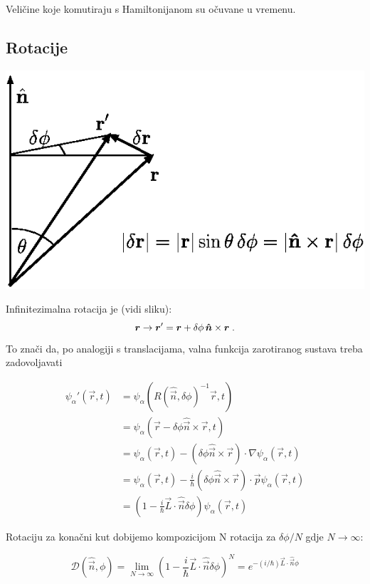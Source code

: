 Veličine koje komutiraju s Hamiltonijanom su očuvane u vremenu.

\subsection{Rotacije}

\centerline{\includegraphics[scale=0.8]{pics/infrotacija.eps}}
Infinitezimalna rotacija je (vidi sliku):
  \begin{displaymath}
  \vec{r}\to\vec{r}'=\vec{r}+\delta\phi\, \unitn\times\vec{r}  \;.
 \end{displaymath}
To znači da, po analogiji s translacijama, valna funkcija zarotiranog
sustava treba zadovoljavati

\begin{equation*}
\begin{split}
\psi_{\alpha}'(\vec{r}, t)&=\psi_{\alpha}(R(\hat{\vec{n}},\delta \phi)^{-1}
\vec{r}, t) \\
 &=\psi_{\alpha}(\vec{r}-\delta\phi\hat{\vec{n}}\times\vec{r}, t) \\
 &=\psi_{\alpha}(\vec{r}, t)-(\delta\phi\hat{\vec{n}}\times\vec{r})\cdot
  \nabla\psi_{\alpha}(\vec{r}, t) \\
 &= \psi_{\alpha}(\vec{r}, t)-\frac{i}{\hbar}(\delta\phi\hat{\vec{n}}\times
  \vec{r})\cdot \vec{p}\psi_{\alpha}(\vec{r}, t) \\
 &= \left(1-\frac{i}{\hbar}\vec{L}\cdot\hat{\vec{n}}\delta\phi \right)
  \psi_{\alpha}(\vec{r}, t)
\end{split}
\end{equation*}

Rotaciju za konačni kut dobijemo kompozicijom N rotacija za $\delta\phi / N$
gdje $N\to\infty$:

\begin{equation}
\mathcal{D}(\hat{\vec{n}}, \phi)=\lim_{N\to\infty}
\left(1-\frac{i}{\hbar}\vec{L}\cdot\hat{\vec{n}}\delta\phi \right)^N
= e^{-(i/\hbar)\vec{L}\cdot\hat{\vec{n}}\phi}
\end{equation}

